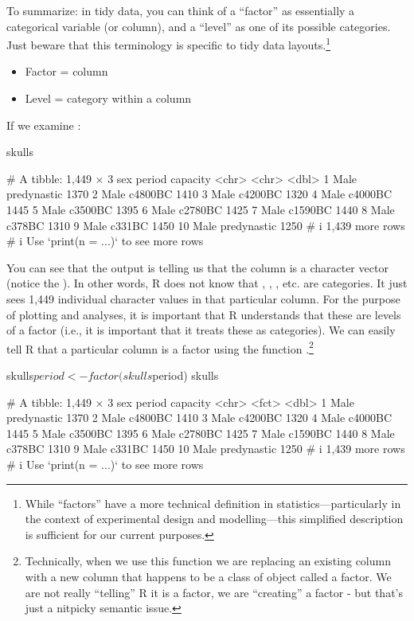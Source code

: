 To summarize: in tidy data, you can think of a ``factor'' as essentially a categorical variable (or column), and a ``level'' as one of its possible categories. Just beware that this terminology is specific to tidy data layouts.\footnote{While ``factors'' have a more technical definition in statistics—particularly in the context of experimental design and modelling—this simplified description is sufficient for our current purposes.}

\clearpage

{
\begin{itemize}
  \setlength\itemsep{-1em}
    \item Factor = column
    \item Level = category within a column
\end{itemize}
}

\noindent
If we examine :

\begin{inR}
skulls
\end{inR}
\begin{outR}
# A tibble: 1,449 × 3
   sex   period      capacity
   <chr> <chr>          <dbl>
 1 Male  predynastic     1370
 2 Male  c4800BC         1410
 3 Male  c4200BC         1320
 4 Male  c4000BC         1445
 5 Male  c3500BC         1395
 6 Male  c2780BC         1425
 7 Male  c1590BC         1440
 8 Male  c378BC          1310
 9 Male  c331BC          1450
10 Male  predynastic     1250
# i 1,439 more rows
# i Use `print(n = ...)` to see more rows
\end{outR}

\noindent
You can see that the output is telling us that the  column is a character vector (notice the ). In other words, R does not know that , , , etc. are categories. It just sees 1,449 individual character values in that particular column. For the purpose of plotting and analyses, it is important that R understands that these are levels of a factor (i.e., it is important that it treats these as categories). We can easily tell R that a particular column is a factor using the function .\footnote{Technically, when we use this function we are replacing an existing column with a new column that happens to be a class of object called a factor. We are not really ``telling'' R it is a factor, we are ``creating'' a factor - but that's just a nitpicky semantic issue.}

\begin{inR}
skulls$period <- factor(skulls$period)
skulls
\end{inR}
\begin{outR}
# A tibble: 1,449 × 3
   sex   period      capacity
   <chr> <fct>          <dbl>
 1 Male  predynastic     1370
 2 Male  c4800BC         1410
 3 Male  c4200BC         1320
 4 Male  c4000BC         1445
 5 Male  c3500BC         1395
 6 Male  c2780BC         1425
 7 Male  c1590BC         1440
 8 Male  c378BC          1310
 9 Male  c331BC          1450
10 Male  predynastic     1250
# i 1,439 more rows
# i Use `print(n = ...)` to see more rows
\end{outR}

